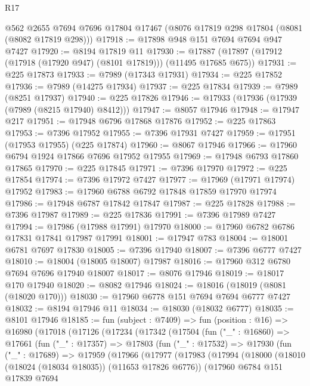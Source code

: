 \begin{lexlean}{R17}
\begin{coremodule}
    @562
    @2655
    @7694
    @7696
    @17804
    @17467
    (@8076 @17819 @298 @17804 (@8081 (@8082 @17819 @298)))
@17918 := @17898 @948 @151 @7694 @7694 @947 @7427
@17920 := @8194 @17819 @11
@17930 := @17887 (@17897 (@17912 (@17918 (@17920 @947) (@8101 @17819))) (@11495 @17685 @675))
@17931 := @225 @17873
@17933 := @7989 (@17343 @17931)
@17934 := @225 @17852
@17936 := @7989 (@14275 @17934)
@17937 := @225 @17834
@17939 := @7989 (@8251 @17937)
@17940 := @225 @17826
@17946 := @17933 (@17936 (@17939 (@7989 (@8215 @17940) @8412)))
@17947 := @8057 @17946
@17948 := @17947 @217
@17951 := @17948 @6796 @17868 @17876
@17952 := @225 @17863
@17953 := @7396 @17952
@17955 := @7396 @17931 @7427
@17959 := @17951 (@17953 @17955) (@225 @17874)
@17960 := @8067 @17946
@17966 := @17960 @6794 @1924 @17866 @7696 @17952 @17955
@17969 := @17948 @6793 @17860 @17865
@17970 := @225 @17845
@17971 := @7396 @17970
@17972 := @225 @17854
@17974 := @7396 @17972 @7427
@17977 := @17969 (@17971 @17974) @17952
@17983 := @17960 @6788 @6792 @17848 @17859 @17970 @17974
@17986 := @17948 @6787 @17842 @17847
@17987 := @225 @17828
@17988 := @7396 @17987
@17989 := @225 @17836
@17991 := @7396 @17989 @7427
@17994 := @17986 (@17988 @17991) @17970
@18000 := @17960 @6782 @6786 @17831 @17841 @17987 @17991
@18001 := @17947 @783
@18004 := @18001 @6781 @7697 @17830
@18005 := @7396 @17940
@18007 := @7396 @6777 @7427
@18010 := @18004 (@18005 @18007) @17987
@18016 := @17960 @312 @6780 @7694 @7696 @17940 @18007
@18017 := @8076 @17946
@18019 := @18017 @170 @17940
@18020 := @8082 @17946
@18024 := @18016 (@18019 (@8081 (@18020 @170)))
@18030 := @17960 @6778 @151 @7694 @7694 @6777 @7427
@18032 := @8194 @17946 @11
@18034 := @18030 (@18032 @6777)
@18035 := @8101 @17946
@18185 := fun (subject : @7409) =>
  fun (position : @16) =>
  @16980
    (@17018
      (@17126
        (@17234
          (@17342
            (@17504
              (fun ("_" : @16860) =>
              @17661
                (fun ("_" : @17357) =>
                @17803
                  (fun ("_" : @17532) =>
                  @17930
                    (fun ("_" : @17689) =>
                    @17959
                      (@17966
                        (@17977
                          (@17983
                            (@17994
                              (@18000
                                (@18010 (@18024 (@18034 @18035)) (@11653 @17826 @6776))
                                (@17960
                                  @6784
                                  @151
                                  @17839
                                  @7694

\end{coremodule}
\end{lexlean}
